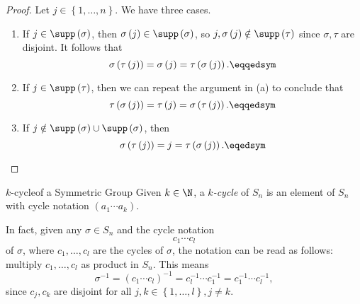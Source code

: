 \documentclass[pmath347]{subfiles}
\begin{document}
    \begin{proof}
        Let $j\in\left\lbrace 1,\ldots,n \right\rbrace$. We have three cases.
        \begin{enumerate}
            \item If $j\in\supp\left( \sigma \right)$, then $\sigma\left( j \right) \in \supp\left( \sigma \right)$, so $j,\sigma\left( j \right) \notin \supp\left( \tau \right)$ since $\sigma,\tau$ are disjoint. It follows that 
                \begin{equation*}
                    \sigma\left( \tau\left( j \right) \right) = \sigma\left( j \right) = \tau\left( \sigma\left( j \right)  \right) . \eqqedsym
                \end{equation*}
            \item If $j\in \supp\left( \tau \right)$, then we can repeat the argument in (a) to conclude that
                \begin{equation*}
                    \tau\left( \sigma\left( j \right) \right) = \tau\left( j \right) = \sigma\left( \tau\left( j \right)  \right) . \eqqedsym
                \end{equation*}
            \item If $j\notin\supp\left( \sigma \right)\cup\supp\left( \sigma \right)$, then
                \begin{equation*}
                    \sigma\left( \tau\left( j \right)  \right) = j = \tau\left( \sigma\left( j \right)  \right) . \eqedsym
                \end{equation*}
        \end{enumerate}
    \end{proof}

    \begin{definition}{$k$-cycle}{of a Symmetric Group}
        Given $k\in\N$, a \emph{$k$-cycle} of $S_n$ is an element of $S_n$ with cycle notation $\left( a_1\cdots a_k \right)$.
    \end{definition}

    \noindent In fact, given any $\sigma\in S_n$ and the cycle notation
    \begin{equation*}
        c_1\cdots c_l
    \end{equation*}
    of $\sigma$, where $c_1,\ldots,c_l$ are the cycles of $\sigma$, the notation can be read as follows: multiply $c_1,\ldots,c_l$ as product in $S_n$. This means
    \begin{equation*}
        \sigma^{-1} = \left( c_1\cdots c_l \right) ^{-1} = c_l^{-1} \cdots c_1^{-1} = c_1^{-1} \cdots c_l^{-1} ,
    \end{equation*}
    since $c_j,c_k$ are disjoint for all $j,k\in \left\lbrace 1,\ldots,l \right\rbrace, j\neq k$.
\end{document}
